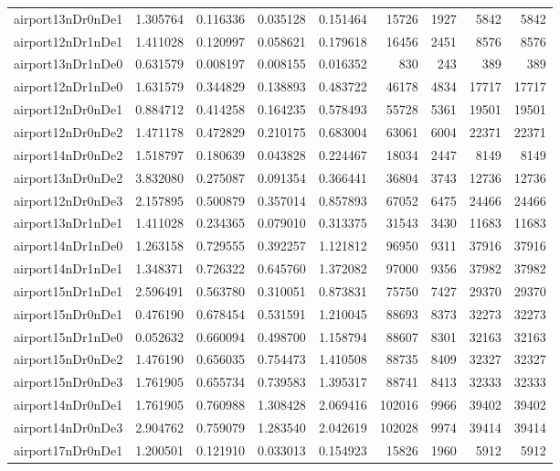 \begin{longtable}{|l|r|r|r|r|r|r|r|r|}
airport13nDr0nDe1 & 1.305764 & 0.116336 & 0.035128 & 0.151464 & 15726 & 1927 & 5842 & 5842 \\
airport12nDr1nDe1 & 1.411028 & 0.120997 & 0.058621 & 0.179618 & 16456 & 2451 & 8576 & 8576 \\
airport13nDr1nDe0 & 0.631579 & 0.008197 & 0.008155 & 0.016352 & 830 & 243 & 389 & 389 \\
airport12nDr1nDe0 & 1.631579 & 0.344829 & 0.138893 & 0.483722 & 46178 & 4834 & 17717 & 17717 \\
airport12nDr0nDe1 & 0.884712 & 0.414258 & 0.164235 & 0.578493 & 55728 & 5361 & 19501 & 19501 \\
airport12nDr0nDe2 & 1.471178 & 0.472829 & 0.210175 & 0.683004 & 63061 & 6004 & 22371 & 22371 \\
airport14nDr0nDe2 & 1.518797 & 0.180639 & 0.043828 & 0.224467 & 18034 & 2447 & 8149 & 8149 \\
airport13nDr0nDe2 & 3.832080 & 0.275087 & 0.091354 & 0.366441 & 36804 & 3743 & 12736 & 12736 \\
airport12nDr0nDe3 & 2.157895 & 0.500879 & 0.357014 & 0.857893 & 67052 & 6475 & 24466 & 24466 \\
airport13nDr1nDe1 & 1.411028 & 0.234365 & 0.079010 & 0.313375 & 31543 & 3430 & 11683 & 11683 \\
airport14nDr1nDe0 & 1.263158 & 0.729555 & 0.392257 & 1.121812 & 96950 & 9311 & 37916 & 37916 \\
airport14nDr1nDe1 & 1.348371 & 0.726322 & 0.645760 & 1.372082 & 97000 & 9356 & 37982 & 37982 \\
airport15nDr1nDe1 & 2.596491 & 0.563780 & 0.310051 & 0.873831 & 75750 & 7427 & 29370 & 29370 \\
airport15nDr0nDe1 & 0.476190 & 0.678454 & 0.531591 & 1.210045 & 88693 & 8373 & 32273 & 32273 \\
airport15nDr1nDe0 & 0.052632 & 0.660094 & 0.498700 & 1.158794 & 88607 & 8301 & 32163 & 32163 \\
airport15nDr0nDe2 & 1.476190 & 0.656035 & 0.754473 & 1.410508 & 88735 & 8409 & 32327 & 32327 \\
airport15nDr0nDe3 & 1.761905 & 0.655734 & 0.739583 & 1.395317 & 88741 & 8413 & 32333 & 32333 \\
airport14nDr0nDe1 & 1.761905 & 0.760988 & 1.308428 & 2.069416 & 102016 & 9966 & 39402 & 39402 \\
airport14nDr0nDe3 & 2.904762 & 0.759079 & 1.283540 & 2.042619 & 102028 & 9974 & 39414 & 39414 \\
airport17nDr0nDe1 & 1.200501 & 0.121910 & 0.033013 & 0.154923 & 15826 & 1960 & 5912 & 5912 \\

\end{longtable}
